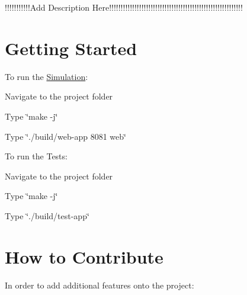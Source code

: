 !!!!!!!!!!!\+Add Description Here!!!!!!!!!!!!!!!!!!!!!!!!!!!!!!!!!!!!!!!!!!!!!!!!!!!!!!!!!!\hypertarget{index_start}{}\section{Getting Started}\label{index_start}
To run the \hyperlink{classSimulation}{Simulation}\+:
\begin{DoxyItemize}
\item Navigate to the project folder
\item Type \char`\"{}make -\/j\char`\"{}
\item Type \char`\"{}./build/web-\/app 8081 web\char`\"{}
\end{DoxyItemize}

To run the Tests\+:
\begin{DoxyItemize}
\item Navigate to the project folder
\item Type \char`\"{}make -\/j\char`\"{}
\item Type \char`\"{}./build/test-\/app\char`\"{}
\end{DoxyItemize}\hypertarget{index_contributions}{}\section{How to Contribute}\label{index_contributions}
In order to add additional features onto the project\+: ~\newline

